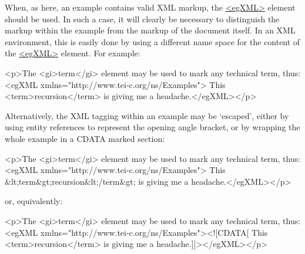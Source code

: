 When, as here, an example contains valid XML markup, the \hyperref[TEI.egXML]{<egXML>} element should be used. In such a case, it will clearly be necessary to distinguish the markup within the example from the markup of the document itself. In an XML environment, this is easily done by using a different name space for the content of the \hyperref[TEI.egXML]{<egXML>} element. For example: \par\hfill\bgroup\exampleFont\vskip 10pt\begin{shaded}
\obeyspaces <p>The <gi>term</gi> element may be used \newline
to mark any technical term, thus:\newline
<egXML xmlns="http://www.tei-c.org/ns/Examples">\newline
  This <term>recursion</term> is \newline
  giving me a headache.</egXML></p>\end{shaded}
\par\egroup 
\par
Alternatively, the XML tagging within an example may be ‘escaped’, either by using entity references to represent the opening angle bracket, or by wrapping the whole example in a CDATA marked section: \par\hfill\bgroup\exampleFont\vskip 10pt\begin{shaded}
\obeyspaces <p>The <gi>term</gi> element may be used \newline
to mark any technical term, thus:\newline
<egXML xmlns="http://www.tei-c.org/ns/Examples">\newline
  This \&lt;term\&gt;recursion\&lt;/term\&gt; is \newline
  giving me a headache.</egXML></p>\end{shaded}
\par\egroup 
 or, equivalently: \par\hfill\bgroup\exampleFont\vskip 10pt\begin{shaded}
\obeyspaces <p>The <gi>term</gi> element may be used \newline
to mark any technical term, thus:\newline
<egXML xmlns="http://www.tei-c.org/ns/Examples"><![CDATA[\newline
  This <term>recursion</term> is \newline
  giving me a headache.]]></egXML></p>\end{shaded}
\par\egroup 
